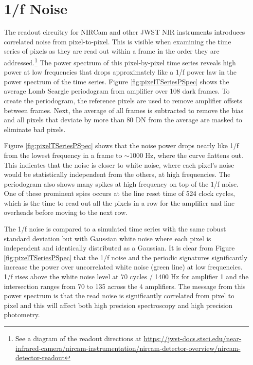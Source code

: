 \documentclass[]{aastex62}
\begin{document}
\section{1/f Noise}
The readout circuitry for NIRCam and other JWST NIR instruments introduces correlated noise from pixel-to-pixel.
This is visible when examining the time series of pixels as they are read out within a frame in the order they are addressed.\footnote{See a diagram of the readout directions at \url{https://jwst-docs.stsci.edu/near-infrared-camera/nircam-instrumentation/nircam-detector-overview/nircam-detector-readout}}
The power spectrum of this pixel-by-pixel time series reveals high power at low frequencies that drops approximately like a 1/f power law in the power spectrum of the time series.
Figure \ref{fig:pixelTSeriesPSpec} shows the average Lomb Scargle periodogram from amplifier over 108 dark frames.
To create the periodogram, the reference pixels are used to remove amplifier offsets between frames.
Next, the average of all frames is subtracted to remove the bias and all pixels that deviate by more than 80 DN from the average are masked to eliminate bad pixels.

Figure \ref{fig:pixelTSeriesPSpec} shows that the noise power drops nearly like 1/f from the lowest frequency in a frame to $\sim$1000 Hz, where the curve flattens out.
This indicates that the noise is closer to white noise, where each pixel's noise would be statistically independent from the others, at high frequencies.
The periodogram also shows many spikes at high frequency on top of the 1/f noise.
One of these prominent spies occurs at the line reset time of 524 clock cycles, which is the time to read out all the pixels in a row for the amplifier and line overheads before moving to the next row.

The 1/f noise is compared to a simulated time series with the same robust standard deviation but with Gaussian white noise where each pixel is independent and identically distributed as a Gaussian.
It is clear from Figure \ref{fig:pixelTSeriesPSpec} that the 1/f noise and the periodic signatures significantly increase the power over uncorrelated white noise (green line) at low frequencies.
1/f rises above the white noise level at 70 cycles / 1400 Hz for amplifier 1 and the intersection ranges from 70 to 135 across the 4 amplifiers.
The message from this power spectrum is that the read noise is significantly correlated from pixel to pixel and this will affect both high precision spectroscopy and high precision photometry.
\end{document}
